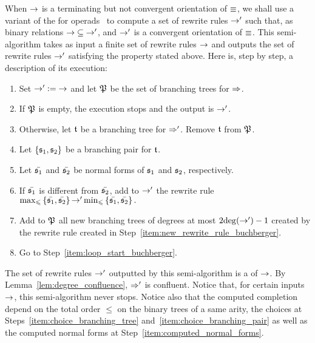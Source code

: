 When $\operatorname{\to}$ is a terminating but not convergent orientation of $\operatorname{\equiv}$,
we shall use a variant of the  for
operads~\cite[Section 3.7]{DK10} to compute a set of rewrite rules
$\operatorname{\to}'$ such that, as binary relations $\operatorname{\to} \subseteq \operatorname{\to}'$, and
$\operatorname{\to}'$ is a convergent orientation of $\operatorname{\equiv}$. This semi-algorithm
takes as input a finite set of rewrite rules $\operatorname{\to}$ and outputs the set
of rewrite rules $\operatorname{\to}'$ satisfying the property stated above. Here is,
step by step, a description of its execution:
\begin{enumerate}[label={(\it\arabic*)}]
    \item Set $\operatorname{\to}' := \operatorname{\to}$ and let $\mathfrak{P}$ be the set of
    branching trees for $\operatorname{\Rightarrow}$.
    \smallbreak

    \item \label{item:loop_start_buchberger}
    If $\mathfrak{P}$ is empty, the execution stops and the output
    is $\operatorname{\to}'$.
    \smallbreak

    \item\label{item:choice_branching_tree} Otherwise, let $\mathfrak{t}$ be a
    branching tree for $\operatorname{\Rightarrow}'$. Remove $\mathfrak{t}$ from
    $\mathfrak{P}$.
    \smallbreak

    \item\label{item:choice_branching_pair} Let $\{\mathfrak{s}_1, \mathfrak{s}_2\}$ be
    a branching pair for $\mathfrak{t}$.
    \smallbreak

    \item\label{item:computed_normal_forms} Let $\bar{\mathfrak{s}_1}$ and
    $\bar{\mathfrak{s}_2}$ be normal forms of $\mathfrak{s}_1$ and $\mathfrak{s}_2$,
    respectively.
    \smallbreak

    \item \label{item:new_rewrite_rule_buchberger}
    If $\bar{\mathfrak{s}_1}$ is different from $\bar{\mathfrak{s}_2}$, add
    to $\operatorname{\to}'$ the rewrite rule
    \begin{math}
        \max_\leqslant \left\{\bar{\mathfrak{s}_1}, \bar{\mathfrak{s}_2}\right\}
        \operatorname{\to}'
        \min_\leqslant \left\{\bar{\mathfrak{s}_1}, \bar{\mathfrak{s}_2}\right\}.
    \end{math}
    \smallbreak

    \item Add to $\mathfrak{P}$ all new branching trees of degrees at
    most $2 \mathrm{deg}(\operatorname{\to}') - 1$ created by the rewrite rule created in
    Step~\ref{item:new_rewrite_rule_buchberger}.
    \smallbreak

    \item Go to Step~\ref{item:loop_start_buchberger}.
\end{enumerate}
The set of rewrite rules $\operatorname{\to}'$ outputted by this semi-algorithm is a
 of $\operatorname{\to}$. By Lemma~\ref{lem:degree_confluence},
$\operatorname{\Rightarrow}'$ is confluent. Notice that, for certain inputs $\operatorname{\to}$,
this semi-algorithm never stops. Notice also that the computed
completion depend on the total order $\leq$ on the binary trees of a
same arity, the choices at Steps~\ref{item:choice_branching_tree}
and~\ref{item:choice_branching_pair} as well as the computed normal
forms at Step~\ref{item:computed_normal_forms}.
\medbreak

